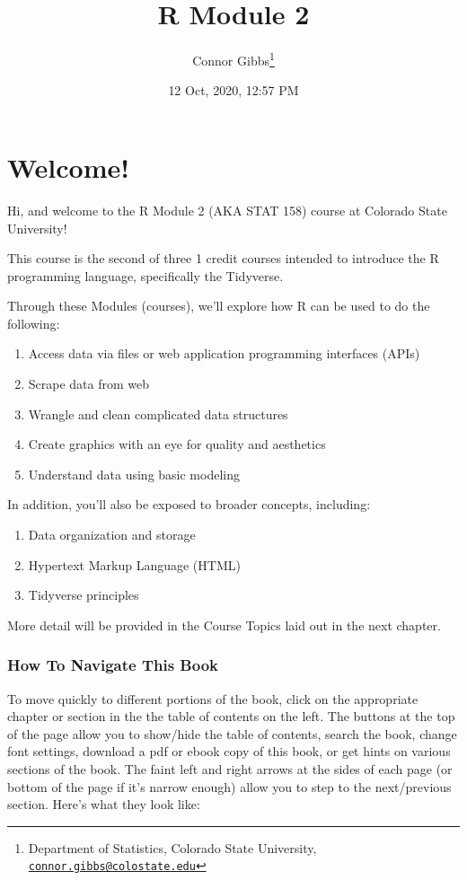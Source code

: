 \documentclass[
]{article}
\title{R Module 2}
\author{Connor Gibbs\footnote{Department of Statistics, Colorado State University, \href{mailto:connor.gibbs@colostate.edu}{\nolinkurl{connor.gibbs@colostate.edu}}}}
\date{12 Oct, 2020, 12:57 PM}
\providecommand{\tightlist}{%
  \setlength{\itemsep}{0pt}\setlength{\parskip}{0pt}}
\begin{document}
\maketitle

{
\setcounter{tocdepth}{2}
\tableofcontents
}
\hypertarget{welcome}{%
\section{Welcome!}\label{welcome}}

Hi, and welcome to the R Module 2 (AKA STAT 158) course at Colorado State University!

This course is the second of three 1 credit courses intended to introduce the R programming language, specifically the Tidyverse.

Through these Modules (courses), we'll explore how R can be used to do the following:

\begin{enumerate}
\def\labelenumi{\arabic{enumi}.}
\tightlist
\item
  Access data via files or web application programming interfaces (APIs)
\item
  Scrape data from web
\item
  Wrangle and clean complicated data structures
\item
  Create graphics with an eye for quality and aesthetics
\item
  Understand data using basic modeling
\end{enumerate}

In addition, you'll also be exposed to broader concepts, including:

\begin{enumerate}
\def\labelenumi{\arabic{enumi}.}
\tightlist
\item
  Data organization and storage
\item
  Hypertext Markup Language (HTML)
\item
  Tidyverse principles
\end{enumerate}

More detail will be provided in the Course Topics laid out in the next chapter.

\hypertarget{how-to-navigate-this-book}{%
\subsubsection{How To Navigate This Book}\label{how-to-navigate-this-book}}

To move quickly to different portions of the book, click on the appropriate chapter or section in the the table of contents on the left.
The buttons at the top of the page allow you to show/hide the table of contents, search the book, change font settings, download a pdf or ebook copy of this book, or get hints on various sections of the book.
The faint left and right arrows at the sides of each page (or bottom of the page if it's narrow enough) allow you to step to the next/previous section.
Here's what they look like:
\end{document}
